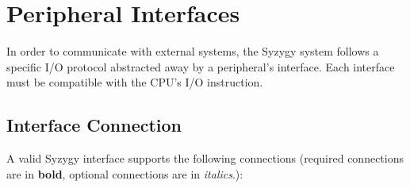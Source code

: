 \documentclass{article}
\begin{document}
	\section{Peripheral Interfaces}

		In order to communicate with external systems, the Syzygy system follows a specific I/O protocol abstracted away by a peripheral's interface. Each interface must be compatible with the CPU's I/O instruction.

		\subsection{Interface Connection}
		
			A valid Syzygy interface supports the following connections (required connections are in \textbf{bold}, optional connections are in \textit{italics}.):
			
\end{document}
